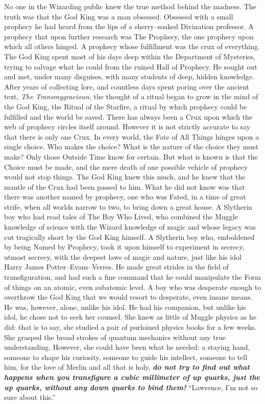 \SmallVSpace
No one in the Wizarding public knew the true method behind the madness. The truth was that the God King was a man obsessed. Obsessed with a small prophecy he had heard from the lips of a sherry\mbox{--}soaked Divination professor. A prophecy that upon further research was The Prophecy, the one prophecy upon which all others hinged. A prophecy whose fulfillment was the crux of everything. The God King spent most of his days deep within the Department of Mysteries, trying to salvage what he could from the ruined Hall of Prophecy. He sought out and met, under many disguises, with many students of deep, hidden knowledge.
\SmallVSpace
After years of collecting lore, and countless days spent poring over the ancient text, \emph{The Transmygracioun}, the thought of a ritual began to grow in the mind of the God King, the Ritual of the Starfire, a ritual by which prophecy could be fulfilled and the world be saved.
\SmallVSpace
There has always been a Crux upon which the web of prophecy circles itself around. However it is not strictly accurate to say that there is only one Crux. In every world, the Fate of All Things hinges upon a single choice. Who makes the choice? What is the nature of the choice they must make? Only those Outside Time know for certain. But what is known is that the Choice must be made, and the mere death of one possible vehicle of prophecy would not stop things. The God King knew this much, and he knew that the mantle of the Crux had been passed to him.
\SmallVSpace
What he did not know was that there was another named by prophecy, one who was Fated, in a time of great strife, when all worlds narrow to two, to bring down a great house. A Slytherin boy who had read tales of The Boy Who Lived, who combined the Muggle knowledge of science with the Wizard knowledge of magic and whose legacy was cut tragically short by the God King himself. A Slytherin boy who, emboldened by being Named by Prophecy, took it upon himself to experiment in secrecy, utmost secrecy, with the deepest laws of magic and nature, just like his idol Harry James Potter\mbox{--}Evans\mbox{--}Verres. He made great strides in the field of transfiguration, and had such a fine command that he could manipulate the Form of things on an atomic, even subatomic level. A boy who was desperate enough to overthrow the God King that we would resort to desperate, even insane means.
\SmallVSpace
He was, however, alone, unlike his idol. He had his companion, but unlike his idol, he chose not to seek her counsel. She knew as little of Muggle physics as he did: that is to say, she studied a pair of purloined physics books for a few weeks. She grasped the broad strokes of quantum mechanics without any true understanding. However, she could have been what he needed: a staying hand, someone to shape his curiosity, someone to guide his intellect, someone to tell him, for the love of Merlin and all that is holy, \emph{\textbf{do not try to find out what happens when you transfigure a cubic millimeter of up quarks, just the up quarks, without any down quarks to bind them!}}
\simpleline
“Lawrence, I’m not so sure about this.”

